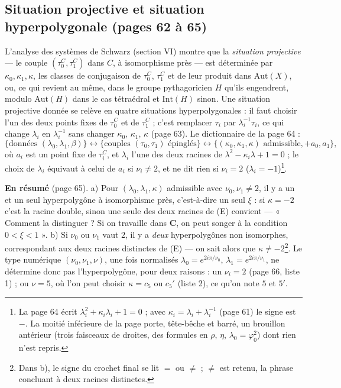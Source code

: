 \documentclass[11pt,a4paper]{article}
\begin{document}
\subsection*{Situation projective et situation hyperpolygonale (pages 62 à 65)}

L'analyse des systèmes de Schwarz (section VI) montre que la \emph{situation
projective} --- le couple $(\tau_0^C, \tau_1^C)$ dans $C$, à isomorphisme
près --- est déterminée par $\kappa_0, \kappa_1, \kappa$, les classes de
conjugaison de $\tau_0^C$, $\tau_1^C$ et de leur produit dans $\mathrm{Aut}(X)$,
ou, ce qui revient au même, dans le groupe pythagoricien $H$ qu'ils
engendrent, modulo $\mathrm{Aut}(H)$ dans le cas tétraédral et
$\mathrm{Int}(H)$ sinon. Une situation projective donnée se relève en quatre
situations hyperpolygonales : il faut choisir l'un des deux points fixes de
$\tau_0^C$ et de $\tau_1^C$ ; c'est remplacer $\tau_i$ par
$\lambda_i^{-1}\tau_i$, ce qui change $\lambda_i$ en $\lambda_i^{-1}$ sans
changer $\kappa_0$, $\kappa_1$, $\kappa$ (page 63). Le dictionnaire de la
page 64 :
\[
  \{\text{données } (\lambda_0, \lambda_1, \beta)\} \leftrightarrow
  \{\text{couples } (\tau_0, \tau_1) \text{ épinglés}\} \leftrightarrow
  \{(\kappa_0, \kappa_1, \kappa) \text{ admissible}, + a_0, a_1\} ,
\]
où $a_i$ est un point fixe de $\tau_i^C$, et $\lambda_i$ l'une des deux racines
de $\lambda^2 - \kappa_i\lambda + 1 = 0$ ; le choix de $\lambda_i$ équivaut à
celui de $a_i$ si $\nu_i \neq 2$, et ne dit rien si $\nu_i = 2$
($\lambda_i = -1$)\footnote{La page 64 écrit $\lambda_i^2 + \kappa_i\lambda_i +
1 = 0$ ; avec $\kappa_i = \lambda_i + \lambda_i^{-1}$ (page 61) le signe est
$-$. La moitié inférieure de la page porte, tête-bêche et barré, un brouillon
antérieur (trois faisceaux de droites, des formules en $\rho$, $\eta$,
$\lambda_0 = \varphi_0^2$) dont rien n'est repris.}.

\textbf{En résumé} (page 65). a) Pour $(\lambda_0, \lambda_1, \kappa)$
admissible avec $\nu_0, \nu_1 \neq 2$, il y a un et un seul hyperpolygône à
isomorphisme près, c'est-à-dire un seul $\xi$ : si $\kappa = -2$ c'est la
racine double, sinon une seule des deux racines de (E) convient --- « Comment
la distinguer ? Si on travaille dans $\mathbf{C}$, on peut songer à la
condition $0 < \xi < 1$ ». b) Si $\nu_0$ ou $\nu_1$ vaut $2$, il y a \emph{deux}
hyperpolygônes non isomorphes, correspondant aux deux racines distinctes de
(E) --- on sait alors que $\kappa \neq -2$\footnote{Dans b), le signe du
crochet final se lit $=$ ou $\neq$ ; $\neq$ est retenu, la phrase concluant à
deux racines distinctes.}. Le type numérique $(\nu_0, \nu_1, \nu)$, une fois
normalisés $\lambda_0 = e^{2i\pi/\nu_0}$, $\lambda_1 = e^{2i\pi/\nu_1}$, ne
détermine donc pas l'hyperpolygône, pour deux raisons : un $\nu_i = 2$ (page
66, liste 1) ; ou $\nu = 5$, où l'on peut choisir $\kappa = c_5$ ou $c_5'$
(liste 2), ce qu'on note $5$ et $5'$.
\end{document}
